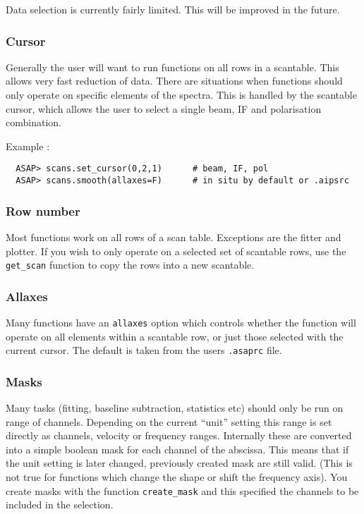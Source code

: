 \documentclass[11pt]{article}
\newcommand{\cmd}[1]{{\tt #1}}
\begin{document}
Data selection is currently fairly limited. This
will be improved in the future.


\subsubsection{Cursor}

Generally the user will want to run functions
on all rows in a scantable. This allows very fast reduction of
data. There are situations when functions should only operate on
specific elements of the spectra. This is handled by the scantable
cursor, which allows the user to select a single beam, IF and
polarisation combination.

Example :

\begin{verbatim}
  ASAP> scans.set_cursor(0,2,1)      # beam, IF, pol
  ASAP> scans.smooth(allaxes=F)      # in situ by default or .aipsrc
\end{verbatim}

\subsubsection{Row number}

Most functions work on all rows of a
scan table. Exceptions are the fitter and plotter. If you wish to only
operate on a selected set of scantable rows, use the \cmd{get\_scan}
function to copy the rows into a new scantable.

\subsubsection{Allaxes}

Many functions have an
\cmd{allaxes} option which controls whether the function will operate
on all elements within a scantable row, or just those selected with
the current cursor. The default is taken from the users {\tt .asaprc}
file.

\subsubsection{Masks}

Many tasks (fitting, baseline
subtraction, statistics etc) should only be run on range of
channels. Depending on the current ``unit'' setting this range is set
directly as channels, velocity or frequency ranges. Internally these
are converted into a simple boolean mask for each channel of the
abscissa. This means that if the unit setting is later changed,
previously created mask are still valid. (This is not true for
functions which change the shape or shift the frequency axis).  You
create masks with the function \cmd{create\_mask} and this specified
the channels to be included in the selection.
\end{document}
